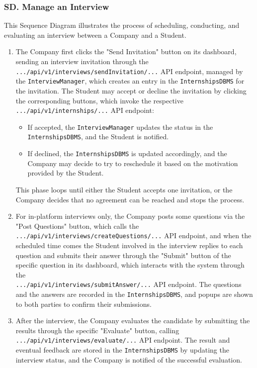 \subsubsection*{SD\cuc. Manage an Interview}
\label{subsubsec:manage_interview_sd}
This Sequence Diagram illustrates the process of scheduling, conducting, and evaluating an interview between a Company and a Student.
\begin{enumerate}
    \item The Company first clicks the "Send Invitation" button on its dashboard, sending an interview invitation through the \texttt{.../api/v1/interviews/sendInvitation/...} API endpoint, managed by the \texttt{InterviewManager}, which creates an entry in the \texttt{InternshipsDBMS} for the invitation. The Student may accept or decline the invitation by clicking the corresponding buttons, which invoke the respective \texttt{.../api/v1/internships/...} API endpoint:
    \begin{itemize}
        \item If accepted, the \texttt{InterviewManager} updates the status in the \texttt{InternshipsDBMS}, and the Student is notified.
        \item If declined, the \texttt{InternshipsDBMS} is updated accordingly, and the Company may decide to try to reschedule it based on the motivation provided by the Student.
    \end{itemize}
    This phase loops until either the Student accepts one invitation, or the Company decides that no agreement can be reached and stops the process.
    
    \item For in-platform interviews only, the Company posts some questions via the "Post Questions" button, which calls the \texttt{.../api/v1/interviews/createQuestions/...} API endpoint, and when the scheduled time comes the Student involved in the interview replies to each question and submits their answer through the "Submit" button of the specific question in its dashboard, which interacts with the system through the \\ \texttt{.../api/v1/interviews/submitAnswer/...} API endpoint. The questions and the answers are recorded in the \texttt{InternshipsDBMS}, and popups are shown to both parties to confirm their submissions.

    \item After the interview, the Company evaluates the candidate by submitting the results through the specific "Evaluate" button, calling \texttt{.../api/v1/interviews/evaluate/...} API endpoint. The result and eventual feedback are stored in the \texttt{InternshipsDBMS} by updating the interview status, and the Company is notified of the successful evaluation.
\end{enumerate}

